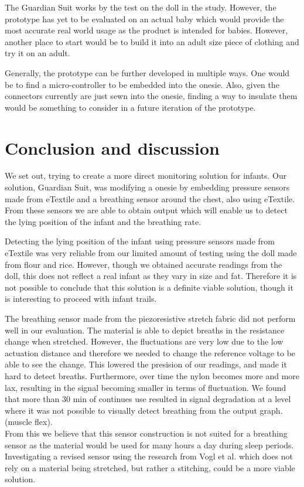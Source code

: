 \documentclass{sigchi-ext}
\begin{document}
The Guardian Suit works by the test on the doll in the study. However,
the prototype has yet to be evaluated on an actual baby which would provide the
most accurate real world usage as the product is intended for babies. However,
another place to start would be to build it into an adult size piece of clothing
and try it on an adult.

Generally, the prototype can be further developed in multiple ways. One would be to 
find a micro-controller to be embedded into the onesie. Also, given the connectors currently are just
sewn into the onesie, finding a way to insulate them would be something to consider in a future
iteration of the prototype.

\section{Conclusion and discussion}
We set out, trying to create a more direct monitoring solution for infants. Our solution, Guardian Suit, was 
modifying a onesie by embedding pressure sensors made from eTextile and a breathing sensor around the
chest, also using eTextile. From these sensors we are able to obtain output which will enable us to 
detect the lying position of the infant and the breathing rate.

Detecting the lying position of the infant using pressure sensors made from eTextile was very reliable from our limited amount of 
testing using the doll made from flour and rice. However, though we obtained accurate readings from the doll, this does not 
reflect a real infant as they vary in size and fat. Therefore it is not possible to conclude that this solution is a definite viable
solution, though it is interesting to proceed with infant trails.

The breathing sensor made from the piezoresistive stretch fabric did not perform well in our evaluation. The material
is able to depict breaths in the resistance change when stretched. However, the fluctuations are very low due to the 
low actuation distance and therefore we needed to change the reference voltage to be able to see the change. This lowered the presision of our readings, and made it hard to detect breaths. Furthermore, 
over time the nylon becomes more and more lax, resulting in the signal becoming smaller in terms of fluctuation. We found that more than 30 min of continues use resulted in signal
degradation at a level where it was not possible to visually detect breathing from the output graph. (muscle flex).\\
From this we believe that this sensor construction is not suited for a breathing sensor as the material would be
used for many hours a day during sleep periods. Investigating a revised sensor using the research from Vogl et al. \cite{stretcheband}
which does not rely on a material being stretched, but rather a stitching, could be a more viable solution.
\end{document}
